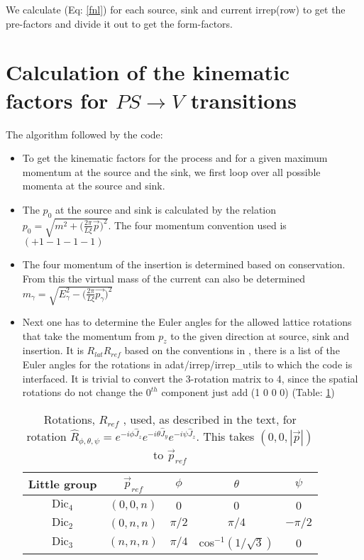 \documentclass[10pt]{article}
\begin{document}
We calculate (Eq: \ref{fnl}) for each source, sink and current irrep(row) to get the pre-factors and divide it out to get the form-factors.


\section{Calculation of the kinematic factors for $PS \rightarrow V$ transitions}
The algorithm followed by the code:
\begin{itemize}
	\item To get the kinematic factors for the process and for a given maximum momentum at the source and the sink, we first loop over all possible momenta at the source and sink.
	\item The $p_0$ at the source and sink is calculated by the relation $p_0 = \sqrt{m^2 + \Big(\frac{2\pi}{L\xi} \vec{p}\Big)^2}$. The four momentum convention used is $(+1 -1 -1 -1)$
	\item The four momentum of the insertion is determined based on conservation. From this the virtual mass of the current can also be determined $m_{\gamma} = \sqrt{E_{\gamma}^2 - \Big(\frac{2\pi}{L\xi} \vec{p_{\gamma}} \Big)^2} $
	\item Next one has to determine the Euler angles for the allowed lattice rotations that take the momentum from $p_z$ to the given direction at source, sink and insertion. It is $R_{lat}R_{ref}$ based on the conventions in \cite{hel}, there is a list of the Euler angles for the rotations in {\myfont adat/irrep/irrep_utils} to which the code is interfaced. It is trivial to convert the 3-rotation matrix to 4, since the spatial rotations do not change the $0^{th}$ component just add (1 0 0 0) (Table: \ref{ref_rot})

\begin{table}[!htbp]
\centering
\hspace{9mm}
\begin{minipage}{0.5\linewidth}
\begin{tabular}{c|c|c|c|c}
\centering
Little group & $\vec{p}_{ref}$ & $\phi$ & $\theta$ & $\psi$ \\ 
\hline
$\mbox{Dic}_4$ & $(0,0,n)$ & 0 & 0 & 0\\
$\mbox{Dic}_2$ & $(0,n,n)$ & $\pi/2$& $\pi/4$ & $-\pi/2$ \\
$\mbox{Dic}_3$ & $(n,n,n)$ & $\pi/4$ & cos$^{-1}(1/\sqrt{3})$ & 0\\
\end{tabular}
\end{minipage}
\caption{Rotations, $R_{ref}$ , used, as described in the text, for rotation $\hat{R}_{\phi,\theta,\psi} = e^{-i\phi\hat{J}_z}e^{-i\theta\hat{J}_y}e^{-i\psi\hat{J}_z}$. This takes $(0,0,|\vec{p}|)$ to $\vec{p}_{ref}$}
\label{ref_rot}
\end{table}


\end{itemize}
\end{document}
